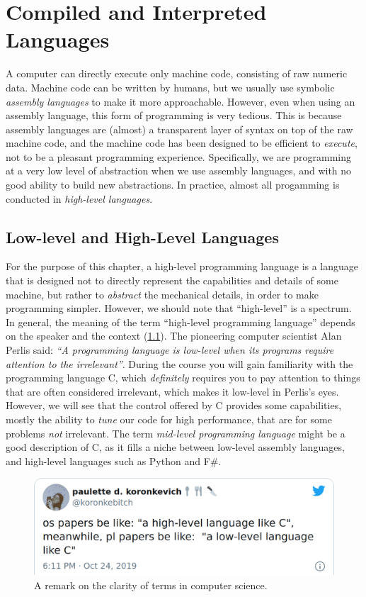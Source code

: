 \chapter{Compiled and Interpreted Languages}

A computer can directly execute only machine code, consisting of raw
numeric data.  Machine code can be written by humans, but we usually
use symbolic \textit{assembly languages} to make it more approachable.
However, even when using an assembly language, this form of
programming is very tedious.  This is because assembly languages are
(almost) a transparent layer of syntax on top of the raw machine code,
and the machine code has been designed to be efficient to
\textit{execute}, not to be a pleasant programming experience.
Specifically, we are programming at a very low level of abstraction
when we use assembly languages, and with no good ability to build new
abstractions.  In practice, almost all progamming is conducted in
\textit{high-level languages}.

\section{Low-level and High-Level Languages}

For the purpose of this chapter, a high-level programming language is
a language that is designed not to directly represent the capabilities
and details of some machine, but rather to \textit{abstract} the
mechanical details, in order to make programming simpler.  However, we
should note that ``high-level'' is a spectrum.  In general, the
meaning of the term ``high-level programming language'' depends on the
speaker and the context (\cref{fig:koronkebitch}).  The pioneering
computer scientist Alan Perlis said: \textit{``A programming language
  is low-level when its programs require attention to the
  irrelevant''}.  During the course you will gain familiarity with the
programming language C, which \textit{definitely} requires you to pay
attention to things that are often considered irrelevant, which makes
it low-level in Perlis's eyes.  However, we will see that the control
offered by C provides some capabilities, mostly the ability to
\textit{tune} our code for high performance, that are for some
problems \textit{not} irrelevant.  The term \textit{mid-level
  programming language} might be a good description of C, as it fills
a niche between low-level assembly languages, and high-level languages
such as Python and F\#.

\begin{figure}
  \centering
  \includegraphics[width=\textwidth]{img/highleveltweet.png}
  \caption{A remark on the clarity of terms in computer science.}
  \label{fig:koronkebitch}
\end{figure}

